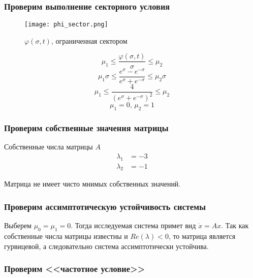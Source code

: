     \subsubsection*{Проверим выполнение секторного условия}
    \begin{figure}[H]
        \centering
        \texttt{[image: phi\_sector.png]}
        \caption{$\varphi(\sigma, t)$, ограниченная сектором}
    \end{figure}

    \[\mu_1 \leq \dfrac{\varphi(\sigma, t)}{\sigma} \leq \mu_2 \]
    \[\mu_1\sigma \leq \dfrac{e^{\sigma} - e^{-\sigma}}{e^{\sigma} + e^{-\sigma}} \leq \mu_2\sigma \]
    \[\mu_1 \leq \dfrac{4}{(e^{\sigma} + e^{-\sigma})^2} \leq \mu_2 \]
    \[\mu_1 = 0,\,\mu_2 = 1\]

    \subsubsection*{Проверим собственные значения матрицы}
    Собственные числа матрицы $A$
    \begin{equation*}
        \begin{aligned}
            \lambda_1 &= -3 \\
            \lambda_2 &= -1
        \end{aligned}
    \end{equation*}

    Матрица не имеет чисто мнимых собственных значений.

    \subsubsection*{Проверим ассимптотическую устойчивость системы}
    Выберем $\mu_0 = \mu_1 = 0$. Тогда исследуемая система примет вид $\dot{x}=Ax$. Так как собственные числа матрицы
    известны и $Re(\lambda) < 0$, то матрица является гурвицевой, а следовательно система ассимптотически устойчива.

    \subsubsection*{Проверим <<частотное условие>>}

    

